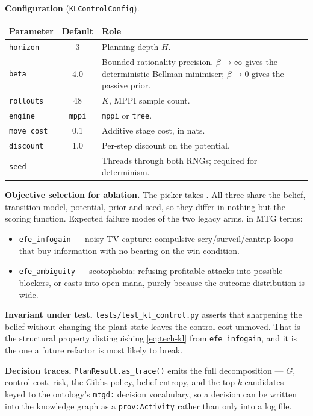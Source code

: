 \documentclass[11pt,a4paper]{article}
\begin{document}
\medskip\noindent\textbf{Configuration} (\texttt{KLControlConfig}).
\begin{center}\small
\begin{tabular}{lcp{7.5cm}}
\toprule
Parameter & Default & Role \\
\midrule
\texttt{horizon} & 3 & Planning depth $H$. \\
\texttt{beta} & 4.0 & Bounded-rationality precision. $\beta\!\to\!\infty$ gives the deterministic Bellman minimiser; $\beta\!\to\!0$ gives the passive prior. \\
\texttt{rollouts} & 48 & $K$, MPPI sample count. \\
\texttt{engine} & \texttt{mppi} & \texttt{mppi} or \texttt{tree}. \\
\texttt{move\_cost} & 0.1 & Additive stage cost, in nats. \\
\texttt{discount} & 1.0 & Per-step discount on the potential. \\
\texttt{seed} & --- & Threads through both RNGs; required for determinism. \\
\bottomrule
\end{tabular}
\end{center}

\medskip\noindent\textbf{Objective selection for ablation.} The picker takes
. All three share the
belief, transition model, potential, prior and seed, so they differ in
nothing but the scoring function. Expected failure modes of the two legacy
arms, in MTG terms:
\begin{itemize}[leftmargin=1.2em, itemsep=1pt]
  \item \texttt{efe\_infogain} --- noisy-TV capture: compulsive
        scry/surveil/cantrip loops that buy information with no bearing on
        the win condition.
  \item \texttt{efe\_ambiguity} --- scotophobia: refusing profitable attacks
        into possible blockers, or casts into open mana, purely because the
        outcome distribution is wide.
\end{itemize}

\medskip\noindent\textbf{Invariant under test.}
\texttt{tests/test\_kl\_control.py} asserts that sharpening the belief
without changing the plant state leaves the control cost unmoved. That is
the structural property distinguishing \eqref{eq:tech-kl} from
\texttt{efe\_infogain}, and it is the one a future refactor is most likely
to break.

\medskip\noindent\textbf{Decision traces.} \texttt{PlanResult.as\_trace()}
emits the full decomposition --- $G$, control cost, risk, the Gibbs policy,
belief entropy, and the top-$k$ candidates --- keyed to the ontology's
\texttt{mtgd:} decision vocabulary, so a decision can be written into the
knowledge graph as a \texttt{prov:Activity} rather than only into a log
file.
\end{document}

